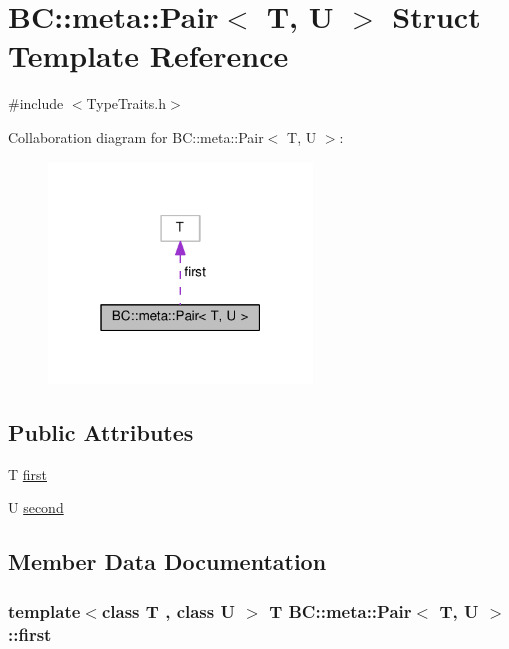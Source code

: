 \hypertarget{structBC_1_1meta_1_1Pair}{}\section{BC\+:\+:meta\+:\+:Pair$<$ T, U $>$ Struct Template Reference}
\label{structBC_1_1meta_1_1Pair}


{\ttfamily \#include $<$Type\+Traits.\+h$>$}



Collaboration diagram for BC\+:\+:meta\+:\+:Pair$<$ T, U $>$\+:
\nopagebreak
\begin{figure}[H]
\begin{center}
\leavevmode
\includegraphics[width=199pt]{structBC_1_1meta_1_1Pair__coll__graph}
\end{center}
\end{figure}
\subsection*{Public Attributes}
\begin{DoxyCompactItemize}
\item 
T \hyperlink{structBC_1_1meta_1_1Pair_a6ad87ded72fed40c4b0333a17ea94631}{first}
\item 
U \hyperlink{structBC_1_1meta_1_1Pair_a69948a251b84d1ca07b5167e0163fa0f}{second}
\end{DoxyCompactItemize}


\subsection{Member Data Documentation}
\subsubsection[{\texorpdfstring{first}{first}}]{\setlength{\rightskip}{0pt plus 5cm}template$<$class T , class U $>$ T {\bf B\+C\+::meta\+::\+Pair}$<$ T, U $>$\+::first}\hypertarget{structBC_1_1meta_1_1Pair_a6ad87ded72fed40c4b0333a17ea94631}{}\label{structBC_1_1meta_1_1Pair_a6ad87ded72fed40c4b0333a17ea94631}
